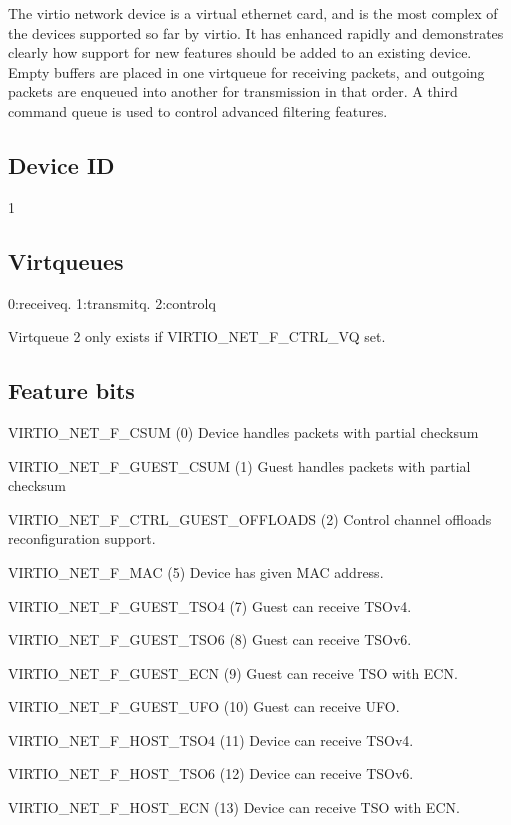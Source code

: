 The virtio network device is a virtual ethernet card, and is the
most complex of the devices supported so far by virtio. It has
enhanced rapidly and demonstrates clearly how support for new
features should be added to an existing device. Empty buffers are
placed in one virtqueue for receiving packets, and outgoing
packets are enqueued into another for transmission in that order.
A third command queue is used to control advanced filtering
features.

\subsection{Device ID}\label{sec:Device Types / Network Device / Device ID}

 1

\subsection{Virtqueues}\label{sec:Device Types / Network Device / Virtqueues}

 0:receiveq. 1:transmitq. 2:controlq

 Virtqueue 2 only exists if VIRTIO_NET_F_CTRL_VQ set.

\subsection{Feature bits}\label{sec:Device Types / Network Device / Feature bits}

  VIRTIO_NET_F_CSUM (0) Device handles packets with partial checksum

  VIRTIO_NET_F_GUEST_CSUM (1) Guest handles packets with partial checksum

  VIRTIO_NET_F_CTRL_GUEST_OFFLOADS (2) Control channel offloads
        reconfiguration support.

  VIRTIO_NET_F_MAC (5) Device has given MAC address.

  VIRTIO_NET_F_GUEST_TSO4 (7) Guest can receive TSOv4.

  VIRTIO_NET_F_GUEST_TSO6 (8) Guest can receive TSOv6.

  VIRTIO_NET_F_GUEST_ECN (9) Guest can receive TSO with ECN.

  VIRTIO_NET_F_GUEST_UFO (10) Guest can receive UFO.

  VIRTIO_NET_F_HOST_TSO4 (11) Device can receive TSOv4.

  VIRTIO_NET_F_HOST_TSO6 (12) Device can receive TSOv6.

  VIRTIO_NET_F_HOST_ECN (13) Device can receive TSO with ECN.

